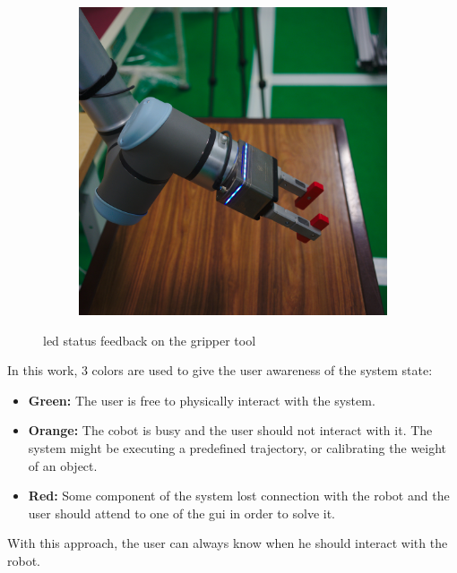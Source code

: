 \begin{figure}[h]
\begin{subfigure}{.2\linewidth}
    \end{subfigure}%
    \begin{subfigure}{.2\linewidth}
        \centering
        \includegraphics[width=.95\linewidth]{figs/chp5/grip_blue.jpg}
    \end{subfigure}
    \caption{\ac{led} status feedback on the gripper tool}
    \label{fig:gripper_leds}
\end{figure}

\par In this work, 3 colors are used to give the user awareness of the system state:

\begin{itemize}
    \item \textbf{Green: } The user is free to physically interact with the system.
    \item \textbf{Orange: } The cobot is busy and the user should not interact with it. The system might be executing a predefined trajectory, or calibrating the weight of an object.
    \item \textbf{Red: } Some component of the system lost connection with the robot and the user should attend to one of the \ac{gui} in order to solve it.
\end{itemize}

\par With this approach, the user can always know when he should interact with the robot.


